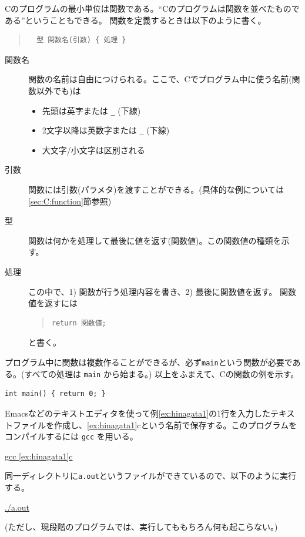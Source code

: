 Cのプログラムの最小単位は関数である。``Cのプログラムは関数を並べたものである''ということもできる。
関数を定義するときは以下のように書く。
\begin{quote}
  \begin{verbatim}
  型 関数名(引数) { 処理 }
  \end{verbatim}
\end{quote}
\begin{description}
\item[関数名] 関数の名前は自由につけられる。ここで、Cでプログラム中に使う名前(関数以外でも)は
  \begin{itemize}
  \item 先頭は英字または \verb+_+ (下線)
  \item 2文字以降は英数字または \verb+_+ (下線)
  \item 大文字/小文字は区別される
  \end{itemize}
\item[引数] 関数には引数(パラメタ)を渡すことができる。(具体的な例については\ref{sec:C:function}節参照)
\item[型] 関数は何かを処理して最後に値を返す(関数値)。この関数値の種類を示す。
\item[処理] この中で、1) 関数が行う処理内容を書き、2) 最後に関数値を返す。
  関数値を返すには
  \begin{quote}
\begin{verbatim}return 関数値;
\end{verbatim}
  \end{quote}
  と書く。
\end{description}
プログラム中に関数は複数作ることができるが、必ず\verb+main+という関数が必要である。(すべての処理は \verb+main+ から始まる。) 以上をふまえて、Cの関数の例を示す。
\begin{reidai}\label{ex:hinagata1}
\begin{verbatim}
int main() { return 0; }
\end{verbatim}
\end{reidai}

Emacsなどのテキストエディタを使って例\ref{ex:hinagata1}の1行を入力したテキストファイルを作成し、\ref{ex:hinagata1}cという名前で保存する。このプログラムをコンパイルするには \verb+gcc+ を用いる。
\begin{commandline2}
\prompt \underline{gcc \ref{ex:hinagata1}c}
\end{commandline2} \noindent
同一ディレクトリに{\tt a.out}というファイルができているので、以下のように実行する。
\begin{commandline2}
\prompt \underline{./a.out}
\end{commandline2} \noindent
(ただし、現段階のプログラムでは、実行してももちろん何も起こらない。)

